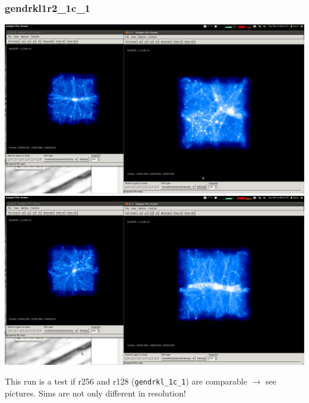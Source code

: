 \documentclass[a4paper,11pt,fleqn,oneside]{book}
\begin{document}
\newpage
\subsubsection{gendrkl1r2\_1c\_1}

\includegraphics[scale=0.2]{gendrkl1r2_1c_1/1.png} \\
\includegraphics[scale=0.2]{gendrkl1r2_1c_1/2.png} 

This run is a test if r256 and r128 (\texttt{gendrkl\_1c\_1}) are comparable $\rightarrow$ see pictures. Sims are not only different in resolution! 
\end{document}
